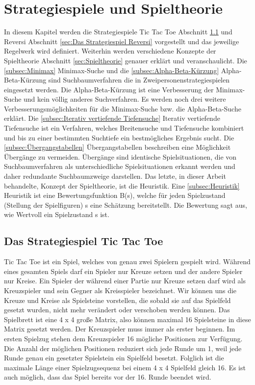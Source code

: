 
\chapter{Strategiespiele und Spieltheorie}
\label{cha:Strategiespiele und Spieltheorie}

In diesem Kapitel werden die Strategiespiele Tic Tac Toe Abschnitt \ref{sec:Das Strategiespiel Tic Tac Toe} und Reversi Abschnitt \ref{sec:Das Strategiespiel Reversi} vorgestellt und das jeweilige Regelwerk wird definiert. Weiterhin werden verschiedene Konzepte der Spieltheorie Abschnitt \ref{sec:Spieltheorie} genauer erklärt und veranschaulicht. Die \ref{subsec:Minimax} Minimax-Suche und die \ref{subsec:Alpha-Beta-Kürzung} Alpha-Beta-Kürzung sind Suchbaumverfahren die in Zweipersonenstrategiespielen eingesetzt werden. Die Alpha-Beta-Kürzung ist eine Verbesserung der Minimax-Suche und kein völlig anderes Suchverfahren. Es werden noch drei weitere Verbesserungsmöglichkeiten für die Minimax-Suche bzw. die Alpha-Beta-Suche erklärt. Die \ref{subsec:Iterativ vertiefende Tiefensuche} Iterativ vertiefende Tiefensuche ist ein Verfahren, welches Breitensuche und Tiefensuche kombiniert und bis zu einer bestimmten Suchtiefe ein bestmögliches Ergebnis sucht. Die \ref{subsec:Übergangstabellen} Übergangstabellen beschreiben eine Möglichkeit Übergänge zu vermeiden. Übergänge sind identische Spielsituationen, die von Suchbaumverfahren als unterschiedliche Spielsituationen erkannt werden und daher redundante Suchbaumzweige darstellen. Das letzte, in dieser Arbeit behandelte, Konzept der Spieltheorie, ist die Heuristik. Eine \ref{subsec:Heuristik} Heuristik ist eine Bewertungsfunktion B(s), welche für jeden Spielzustand (Stellung der Spielfiguren) s eine Schätzung bereitstellt. Die Bewertung sagt aus, wie Wertvoll ein Spielzustand s ist.

\section{Das Strategiespiel Tic Tac Toe}
\label{sec:Das Strategiespiel Tic Tac Toe}

Tic Tac Toe ist ein Spiel, welches von genau zwei Spielern gespielt wird. Während eines gesamten Spiels darf ein Spieler nur Kreuze setzen und der andere Spieler nur Kreise. Ein Spieler der während einer Partie nur Kreuze setzen darf wird als Kreuzspieler und sein Gegner als Kreisspieler bezeichnet. Wir können uns die Kreuze und Kreise als Spielsteine vorstellen, die sobald sie auf das Spielfeld gesetzt wurden, nicht mehr verändert oder verschoben werden können. Das Spielbrett ist eine 4 x 4 große Matrix, also können maximal 16 Spielsteine in diese Matrix gesetzt werden. Der Kreuzspieler muss immer als erster beginnen. Im ersten Spielzug stehen dem Kreuzspieler 16 mögliche Positionen zur Verfügung. Die Anzahl der möglichen Positionen reduziert sich jede Runde um 1, weil jede Runde genau ein gesetzter Spielstein ein Spielfeld besetzt. Folglich ist die maximale Länge einer Spielzugsequenz bei einem 4 x 4 Spielfeld gleich 16. Es ist auch möglich, dass das Spiel bereits vor der 16. Runde beendet wird. \\

